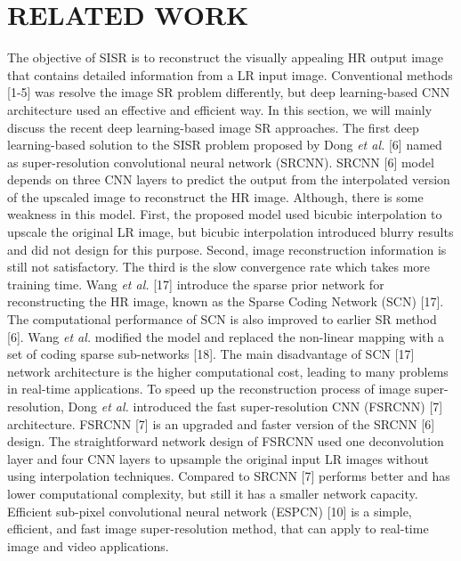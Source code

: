 \documentclass{ieeeaccess}
\begin{document}
\section{RELATED WORK}
The objective of SISR is to reconstruct the visually appealing HR output image that contains detailed information from a LR input image. Conventional methods [1-5] was resolve the image SR problem differently, but deep learning-based CNN architecture used an effective and efficient way. In this section, we will mainly discuss the recent deep learning-based image SR approaches. The first deep learning-based solution to the SISR problem proposed by Dong \textit{et al.} [6] named as super-resolution convolutional neural network (SRCNN). SRCNN [6] model depends on three CNN layers to predict the output from the interpolated version of the upscaled image to reconstruct the HR image. Although, there is some weakness in this model. First, the proposed model used bicubic interpolation to upscale the original LR image, but bicubic interpolation introduced blurry results and did not design for this purpose. Second, image reconstruction information is still not satisfactory. The third is the slow convergence rate which takes more training time. Wang \textit{et al.} [17] introduce the sparse prior network for reconstructing the HR image, known as the Sparse Coding Network (SCN) [17]. The computational performance of SCN is also improved to earlier SR method [6]. Wang \textit{et al.} modified the model and replaced the non-linear mapping with a set of coding sparse sub-networks [18]. The main disadvantage of SCN [17] network architecture is the higher computational cost, leading to many problems in real-time applications.
To speed up the reconstruction process of image super-resolution, Dong \textit{et al.} introduced the  fast super-resolution CNN (FSRCNN) [7] architecture. FSRCNN [7] is an upgraded and faster version of the SRCNN [6] design. The straightforward network design of FSRCNN used one deconvolution layer and four CNN layers to upsample the original input LR images without using interpolation techniques. Compared to SRCNN  [7] performs better and has lower computational complexity, but still it has a smaller network capacity. Efficient sub-pixel convolutional neural network (ESPCN) [10] is a simple, efficient, and fast image super-resolution method, that can apply to real-time image and video applications.
\end{document}
